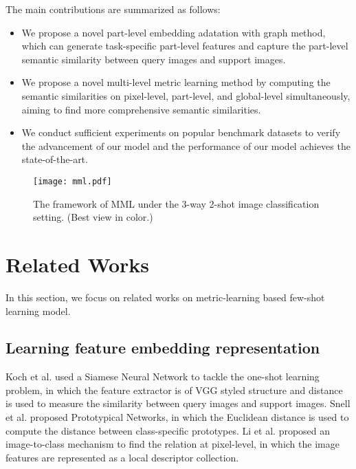 \documentclass{article}
\begin{document}
The main contributions are summarized as follows: 
\begin{itemize}
	\setlength{\itemsep}{0pt}
	\setlength{\parsep}{0pt}
	\setlength{\parskip}{0pt}
	\item We propose a novel part-level embedding adatation with graph method, which can generate task-specific part-level features and capture the part-level semantic similarity between query images and support images. 
	\item We propose a novel multi-level metric learning method by computing the semantic similarities on pixel-level, part-level, and global-level simultaneously, aiming to find more comprehensive semantic similarities. 
	\item We conduct sufficient experiments on popular benchmark datasets to verify the advancement of our model and the performance of our model achieves the state-of-the-art.
\end{itemize}
\begin{figure*}[t]
	\centering
	\texttt{[image: mml.pdf]}
	\caption{The framework of MML under the 3-way 2-shot image classification setting. (Best view in color.)}
	\label{mml_architecture}
\end{figure*}


\section{Related Works}
In this section, we focus on related works on metric-learning based few-shot learning model.

\subsection{Learning feature embedding representation}
Koch et al. \cite{koch2015siamese} used a Siamese Neural Network to tackle the one-shot learning problem, in which the feature extractor is of VGG styled structure and  distance is used to measure the similarity between query images and support images.
Snell et al. \cite{snell2017prototypical} proposed Prototypical Networks, in which the Euclidean distance is used to compute the distance between class-specific prototypes. 
Li et al. \cite{li2019revisiting} proposed an image-to-class mechanism to find the relation at pixel-level, in which the image features are represented as a local descriptor collection.
\end{document}
